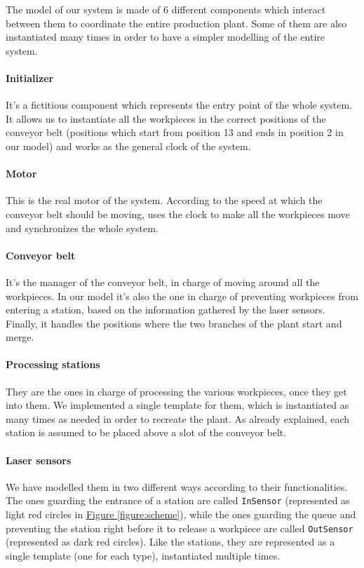 \documentclass[a4paper,twoside]{article}
\newcommand{\figureref}[1]{\textsf{\hyperref[#1]{Figure \ref*{#1}}}}
\begin{document}
    The model of our system is made of 6 different components which interact between them to coordinate the entire production plant. Some of them are also instantiated many times in order to have a simpler modelling of the entire system.

    \paragraph{Initializer} It's a fictitious component which represents the entry point of the whole system. It allows us to instantiate all the workpieces in the correct positions of the conveyor belt (positions which start from position 13 and ends in position 2 in our model) and works as the general clock of the system.

    \paragraph{Motor} This is the real motor of the system. According to the speed at which the conveyor belt should be moving, uses the clock to make all the workpieces move and synchronizes the whole system.

    \paragraph{Conveyor belt} It's the manager of the conveyor belt, in charge of moving around all the workpieces. In our model it's also the one in charge of preventing workpieces from entering a station, based on the information gathered by the laser sensors. Finally, it handles the positions where the two branches of the plant start and merge.

    \paragraph{Processing stations} They are the ones in charge of processing the various workpieces, once they get into them. We implemented a single template for them, which is instantiated as many times as needed in order to recreate the plant. As already explained, each station is assumed to be placed above a slot of the conveyor belt.

    \paragraph{Laser sensors} We have modelled them in two different ways according to their functionalities. The ones guarding the entrance of a station are called \texttt{InSensor} (represented as light red circles in \figureref{figure:scheme}), while the ones guarding the queue and preventing the station right before it to release a workpiece are called \texttt{OutSensor} (represented as dark red circles). Like the stations, they are represented as a single template (one for each type), instantiated multiple times.
\end{document}
